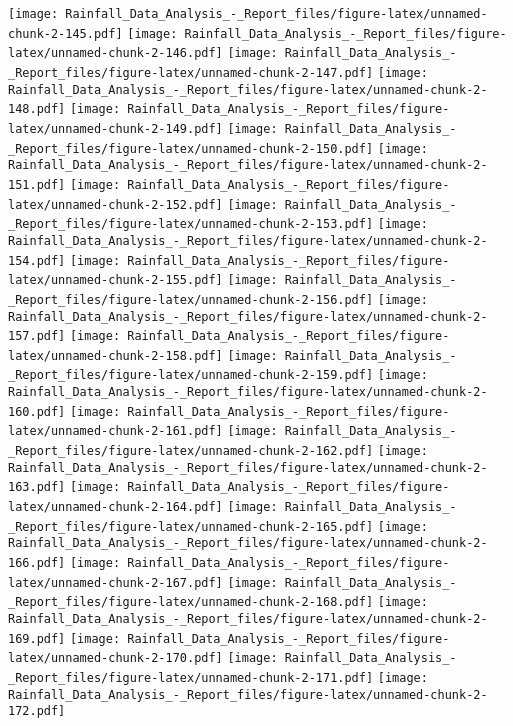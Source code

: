\documentclass[
]{article}
\begin{document}
\texttt{[image: Rainfall\_Data\_Analysis\_-\_Report\_files/figure-latex/unnamed-chunk-2-145.pdf]}
\texttt{[image: Rainfall\_Data\_Analysis\_-\_Report\_files/figure-latex/unnamed-chunk-2-146.pdf]}
\texttt{[image: Rainfall\_Data\_Analysis\_-\_Report\_files/figure-latex/unnamed-chunk-2-147.pdf]}
\texttt{[image: Rainfall\_Data\_Analysis\_-\_Report\_files/figure-latex/unnamed-chunk-2-148.pdf]}
\texttt{[image: Rainfall\_Data\_Analysis\_-\_Report\_files/figure-latex/unnamed-chunk-2-149.pdf]}
\texttt{[image: Rainfall\_Data\_Analysis\_-\_Report\_files/figure-latex/unnamed-chunk-2-150.pdf]}
\texttt{[image: Rainfall\_Data\_Analysis\_-\_Report\_files/figure-latex/unnamed-chunk-2-151.pdf]}
\texttt{[image: Rainfall\_Data\_Analysis\_-\_Report\_files/figure-latex/unnamed-chunk-2-152.pdf]}
\texttt{[image: Rainfall\_Data\_Analysis\_-\_Report\_files/figure-latex/unnamed-chunk-2-153.pdf]}
\texttt{[image: Rainfall\_Data\_Analysis\_-\_Report\_files/figure-latex/unnamed-chunk-2-154.pdf]}
\texttt{[image: Rainfall\_Data\_Analysis\_-\_Report\_files/figure-latex/unnamed-chunk-2-155.pdf]}
\texttt{[image: Rainfall\_Data\_Analysis\_-\_Report\_files/figure-latex/unnamed-chunk-2-156.pdf]}
\texttt{[image: Rainfall\_Data\_Analysis\_-\_Report\_files/figure-latex/unnamed-chunk-2-157.pdf]}
\texttt{[image: Rainfall\_Data\_Analysis\_-\_Report\_files/figure-latex/unnamed-chunk-2-158.pdf]}
\texttt{[image: Rainfall\_Data\_Analysis\_-\_Report\_files/figure-latex/unnamed-chunk-2-159.pdf]}
\texttt{[image: Rainfall\_Data\_Analysis\_-\_Report\_files/figure-latex/unnamed-chunk-2-160.pdf]}
\texttt{[image: Rainfall\_Data\_Analysis\_-\_Report\_files/figure-latex/unnamed-chunk-2-161.pdf]}
\texttt{[image: Rainfall\_Data\_Analysis\_-\_Report\_files/figure-latex/unnamed-chunk-2-162.pdf]}
\texttt{[image: Rainfall\_Data\_Analysis\_-\_Report\_files/figure-latex/unnamed-chunk-2-163.pdf]}
\texttt{[image: Rainfall\_Data\_Analysis\_-\_Report\_files/figure-latex/unnamed-chunk-2-164.pdf]}
\texttt{[image: Rainfall\_Data\_Analysis\_-\_Report\_files/figure-latex/unnamed-chunk-2-165.pdf]}
\texttt{[image: Rainfall\_Data\_Analysis\_-\_Report\_files/figure-latex/unnamed-chunk-2-166.pdf]}
\texttt{[image: Rainfall\_Data\_Analysis\_-\_Report\_files/figure-latex/unnamed-chunk-2-167.pdf]}
\texttt{[image: Rainfall\_Data\_Analysis\_-\_Report\_files/figure-latex/unnamed-chunk-2-168.pdf]}
\texttt{[image: Rainfall\_Data\_Analysis\_-\_Report\_files/figure-latex/unnamed-chunk-2-169.pdf]}
\texttt{[image: Rainfall\_Data\_Analysis\_-\_Report\_files/figure-latex/unnamed-chunk-2-170.pdf]}
\texttt{[image: Rainfall\_Data\_Analysis\_-\_Report\_files/figure-latex/unnamed-chunk-2-171.pdf]}
\texttt{[image: Rainfall\_Data\_Analysis\_-\_Report\_files/figure-latex/unnamed-chunk-2-172.pdf]}
\end{document}
